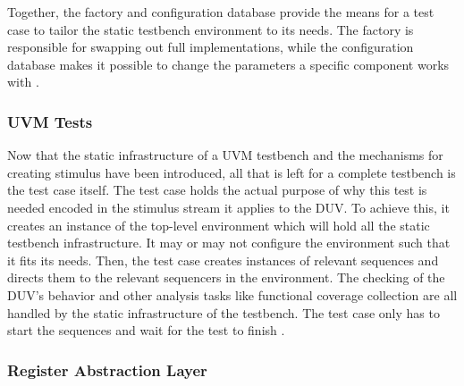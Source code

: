 \documentclass[11pt,a4paper]{report}
\begin{document}
Together, the factory and configuration database provide the means for a test case to tailor the static testbench
environment to its needs. The factory is responsible for swapping out full implementations, while the configuration
database makes it possible to change the parameters a specific component works with \cite[Ch. 4.3]{mehta2018asic}.

\subsubsection{UVM Tests} %

Now that the static infrastructure of a UVM testbench and the mechanisms for creating stimulus have been introduced,
all that is left for a complete testbench is the test case itself. The test case holds the actual purpose of why this
test is needed encoded in the stimulus stream it applies to the DUV. To achieve this, it creates an instance of the
top-level environment which will hold all the static testbench infrastructure. It may or may not configure the
environment such that it fits its needs. Then, the test case creates instances of relevant sequences and directs them
to the relevant sequencers in the environment. The checking of the DUV's behavior and other analysis tasks like
functional coverage collection are all handled by the static infrastructure of the testbench. The test case only has
to start the sequences and wait for the test to finish \cite[Ch. 4.3]{mehta2018asic}.

\subsubsection{Register Abstraction Layer} %
\end{document}
